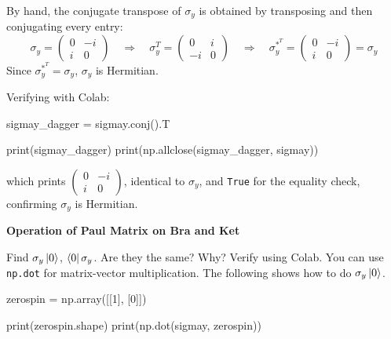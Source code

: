 \documentclass[a4paper, 10pt]{article}
\begin{document}
\begin{solution}
	By hand, the conjugate transpose of \( \sigma_y \) is obtained by transposing and then conjugating every entry:
	\[
		\sigma_y = \begin{pmatrix}
			0 & -i \\
			i & 0
		\end{pmatrix}
		\quad\Longrightarrow\quad
		\sigma_y^T = \begin{pmatrix}
			0  & i \\
			-i & 0
		\end{pmatrix}
		\quad\Longrightarrow\quad
		\sigma_y^{*^T} = \begin{pmatrix}
			0 & -i \\
			i & 0
		\end{pmatrix} = \sigma_y
	\]
	Since \( \sigma_y^{*^T} = \sigma_y \), \( \sigma_y \) is Hermitian.

	Verifying with Colab:
	\begin{codingbox}
sigmay_dagger = sigmay.conj().T

print(sigmay_dagger)
print(np.allclose(sigmay_dagger, sigmay))
\end{codingbox}
	which prints \( \begin{pmatrix} 0 & -i \\ i & 0 \end{pmatrix} \),
	identical to \( \sigma_y \), and \texttt{True} for the equality check,
	confirming \( \sigma_y \) is Hermitian.
\end{solution}

\newpage

\begin{problem}
\textbf{Operation of Paul Matrix on Bra and Ket}
\par Find \( \sigma_y \ket{0} \), \( \bra{0} \sigma_y \).
Are they the same? Why? Verify using Colab.
You can use \texttt{np.dot} for matrix-vector multiplication.
The following shows how to do \( \sigma_y \ket{0} \).
\begin{codingbox}
zerospin = np.array([[1], [0]])

print(zerospin.shape)
print(np.dot(sigmay, zerospin))
\end{codingbox}
\end{problem}
\end{document}
